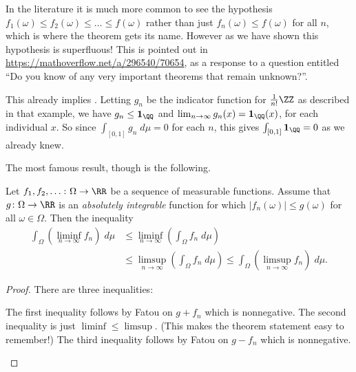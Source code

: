 \begin{remark}
	In the literature it is much more common
	to see the hypothesis $f_1(\omega) \le f_2(\omega) \le \dots \le f(\omega)$
	rather than just $f_n(\omega) \le f(\omega)$ for all $n$,
	which is where the theorem gets its name.
	However as we have shown this hypothesis is superfluous!
	This is pointed out in \url{https://mathoverflow.net/a/296540/70654},
	as a response to a question entitled
	``Do you know of any very important theorems that remain unknown?''.
\end{remark}

\begin{example}
	This already implies .
	Letting $g_n$ be the indicator function for $\frac1{n!}\ZZ$
	as described in that example, we have $g_n \le \mathbf{1}_\QQ$
	and $\lim_{n \to \infty} g_n(x) = \mathbf{1}_\QQ(x)$,
	for each individual $x$.
	So since $\int_{[0,1]} g_n \; d\mu = 0$ for each $n$,
	this gives $\int_{[0,1]} \mathbf{1}_\QQ = 0$ as we already knew.
\end{example}

The most famous result, though is the following.
\begin{corollary}
	Let $f_1, f_2, \dots \colon \Omega \to \RR$
	be a sequence of measurable functions.
	Assume that $g \colon \Omega \to \RR$ is an
	\emph{absolutely integrable} function for which
	$|f_n(\omega)| \le g(\omega)$ for all $\omega \in \Omega$.
	Then the inequality
	\begin{align*}
		\int_\Omega \left( \liminf_{n \to \infty} f_n \right) \; d\mu
		&\le \liminf_{n \to \infty} \left( \int_\Omega f_n \; d\mu \right) \\
		&\le \limsup_{n \to \infty} \left( \int_\Omega f_n \; d\mu \right)
		\le \int_\Omega \left( \limsup_{n \to \infty} f_n \right) \; d\mu.
	\end{align*}
\end{corollary}
\begin{proof}
	There are three inequalities:
	\begin{itemize}
		\ii The first inequality follows by Fatou on $g + f_n$ which is nonnegative.
		\ii The second inequality is just $\liminf \le \limsup$.
		(This makes the theorem statement easy to remember!)
		\ii The third inequality follows by Fatou on $g - f_n$ which is nonnegative.
		\qedhere
	\end{itemize}
\end{proof}

